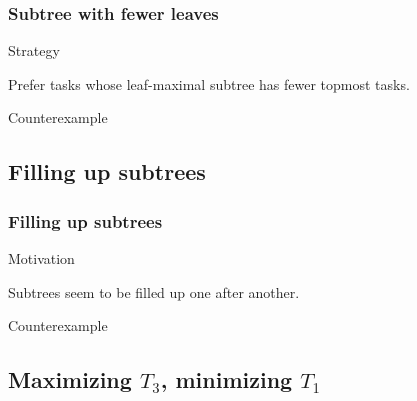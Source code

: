 \documentclass{beamer}
\newenvironment{strategyblock}
{
  \begin{block}{Strategy}
}
{
  \end{block}
}
\newenvironment{motivationblock}
{
  \begin{block}{Motivation}
}
{
  \end{block}
}
\newenvironment{counterexampleblock}
{
  \begin{alertblock}{Counterexample}
}
{
  \end{alertblock}
}
\newcommand{\todo}[1]{ {\color{red}{#1} }}
\begin{document}
\begin{frame}
  \frametitle{Subtree with fewer leaves}
  \begin{strategyblock}
    Prefer tasks whose leaf-maximal subtree has fewer topmost tasks.
  \end{strategyblock}
  \begin{counterexampleblock}
    \todo{Bild.}
  \end{counterexampleblock}
\end{frame}

\subsection{Filling up subtrees}

\begin{frame}
  \frametitle{Filling up subtrees}
  \begin{motivationblock}
    Subtrees seem to be filled up one after another.
  \end{motivationblock}
  \begin{counterexampleblock}
    \begin{center}
      
    \end{center}
  \end{counterexampleblock}
\end{frame}

\subsection{Maximizing $T_3$, minimizing $T_1$}
\end{document}
